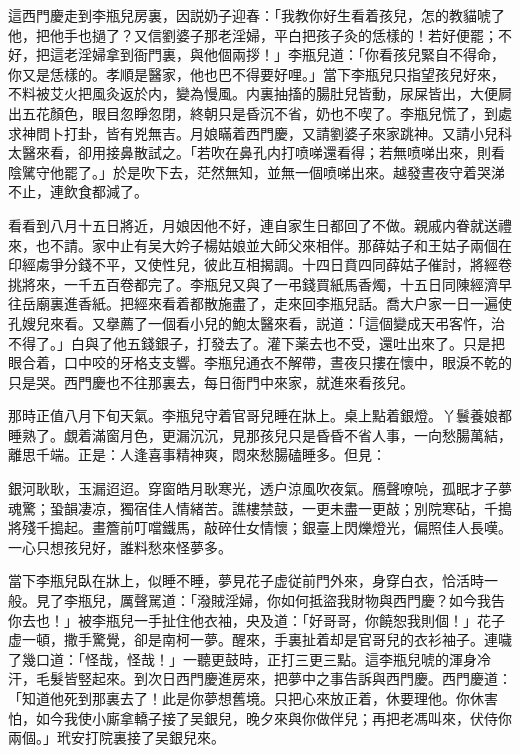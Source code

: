 這西門慶走到李瓶兒房裏，因説奶子迎春：「我教你好生看着孩兒，怎的教貓唬了他，把他手也撾了？又信劉婆子那老淫婦，平白把孩子灸的恁樣的！若好便罷；不好，把這老淫婦拿到衙門裏，與他個兩拶！」李瓶兒道：「你看孩兒緊自不得命，你又是恁樣的。孝順是醫家，他也巴不得要好哩。」當下李瓶兒只指望孩兒好來，不料被艾火把風灸返於内，變為慢風。内裏抽搐的腸肚兒皆動，尿屎皆出，大便屙出五花顏色，眼目忽睜忽閉，終朝只是昏沉不省，奶也不喫了。李瓶兒慌了，到處求神問卜打卦，皆有兇無吉。月娘瞞着西門慶，又請劉婆子來家跳神。又請小兒科太醫來看，卻用接鼻散試之。「若吹在鼻孔内打喷㖒還看得；若無喷㖒出來，則看陰騭守他罷了。」於是吹下去，茫然無知，並無一個喷㖒出來。越發晝夜守着哭涕不止，連飲食都減了。

看看到八月十五日將近，月娘因他不好，連自家生日都回了不做。親戚内眷就送禮來，也不請。家中止有吴大妗子楊姑娘並大師父來相伴。那薛姑子和王姑子兩個在印經䖏爭分錢不平，又使性兒，彼此互相揭調。十四日賁四同薛姑子催討，將經卷挑將來，一千五百卷都完了。李瓶兒又與了一弔錢買紙馬香燭，十五日同陳經濟早往岳廟裏進香紙。把經來看着都散施盡了，走來回李瓶兒話。喬大户家一日一遍使孔嫂兒來看。又擧薦了一個看小兒的鮑太醫來看，説道：「這個變成天弔客忤，治不得了。」白與了他五錢銀子，打發去了。灌下薬去也不受，還吐出來了。只是把眼合着，口中咬的牙格支支響。李瓶兒通衣不解帶，晝夜只摟在懷中，眼淚不乾的只是哭。西門慶也不往那裏去，每日衙門中來家，就進來看孩兒。

那時正值八月下旬天氣。李瓶兒守着官哥兒睡在牀上。桌上點着銀燈。丫鬟養娘都睡熟了。覷着滿窗月色，更漏沉沉，見那孩兒只是昏昏不省人事，一向愁腸萬結，離思千端。正是：人逢喜事精神爽，悶來愁腸磕睡多。但見：

\begin{myquote}
銀河耿耿，玉漏迢迢。穿窗皓月耿寒光，透户涼風吹夜氣。鴈聲嘹喨，孤眠才子夢魂驚；蛩韻凄凉，獨宿佳人情緒苦。譙樓禁鼓，一更未盡一更敲；別院寒砧，千搗將殘千搗起。畫簷前叮噹鐵馬，敲碎仕女情懷；銀臺上閃爍燈光，偏照佳人長嘆。一心只想孩兒好，誰料愁來怪夢多。
\end{myquote}

當下李瓶兒臥在牀上，似睡不睡，夢見花子虚従前門外來，身穿白衣，恰活時一般。見了李瓶兒，厲聲駡道：「潑賊淫婦，你如何抵盜我財物與西門慶？如今我告你去也！」被李瓶兒一手扯住他衣袖，央及道：「好哥哥，你饒恕我則個！」花子虚一頓，撒手驚覺，卻是南柯一夢。醒來，手裏扯着却是官哥兒的衣衫袖子。連噦了幾口道：「怪哉，怪哉！」一聽更鼓時，正打三更三點。這李瓶兒唬的渾身冷汗，毛髮皆竪起來。到次日西門慶進房來，把夢中之事告訴與西門慶。西門慶道：「知道他死到那裏去了！此是你夢想舊境。只把心來放正着，休要理他。你休害怕，如今我使小廝拿轎子接了吴銀兒，晚夕來與你做伴兒；再把老馮叫來，伏侍你兩個。」玳安打院裏接了吴銀兒來。

